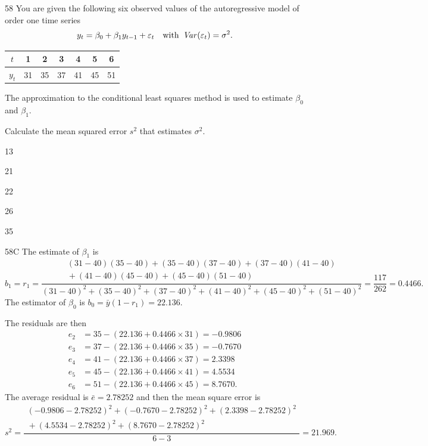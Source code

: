 \begin{question}{58}
You are given the following six observed values of the autoregressive model of order one time series
\[ y_t = \beta_0 + \beta_1 y_{t-1} + \varepsilon_t \quad \text{with}\ \operatorname{\mathit{Var}}(\varepsilon_t) = \sigma^2. \]
\begin{center}
\begin{tabular}{|c|c|c|c|c|c|c|}
\hline
$t$   & 1  & 2  & 3  & 4  & 5  & 6  \\ \hline
$y_t$ & 31 & 35 & 37 & 41 & 45 & 51 \\ \hline
\end{tabular}
\end{center}

The approximation to the conditional least squares method is used to estimate $\beta_0$ and $\beta_1$.

Calculate the mean squared error $s^2$ that estimates $\sigma^2$.

\begin{choices}
\item 13
\item 21
\item 22
\item 26
\item 35
\end{choices}
\end{question}
\begin{solution}{58}{C}
The estimate of $\beta_1$ is
\[ b_1 = r_1 = \dfrac{\begin{array}{c}(31-40)(35-40) + (35-40)(37-40) + (37-40)(41-40) \\ {}+ (41-40)(45-40) + (45-40)(51-40)\end{array}}{(31-40)^2 + (35-40)^2 + (37-40)^2 + (41-40)^2 + (45-40)^2 + (51-40)^2} = \dfrac{117}{262} = 0.4466. \]
The estimator of $\beta_0$ is $b_0 = \bar{y}(1 - r_1) = 22.136$.

The residuals are then
\begin{align*}
e_2 &= 35 - (22.136 + 0.4466 \times 31) = -0.9806 \\
e_3 &= 37 - (22.136 + 0.4466 \times 35) = -0.7670 \\
e_4 &= 41 - (22.136 + 0.4466 \times 37) = 2.3398 \\
e_5 &= 45 - (22.136 + 0.4466 \times 41) = 4.5534 \\
e_6 &= 51 - (22.136 + 0.4466 \times 45) = 8.7670.
\end{align*}
The average residual is $\bar{e} = 2.78252$ and then the mean square error is
\[ s^2 = \dfrac{\begin{array}{c}(-0.9806 - 2.78252)^2 + (-0.7670 - 2.78252)^2 + (2.3398 - 2.78252)^2 \\ {}+ (4.5534 - 2.78252)^2 + (8.7670 - 2.78252)^2\end{array}}{6 - 3} = 21.969. \]
\end{solution}

